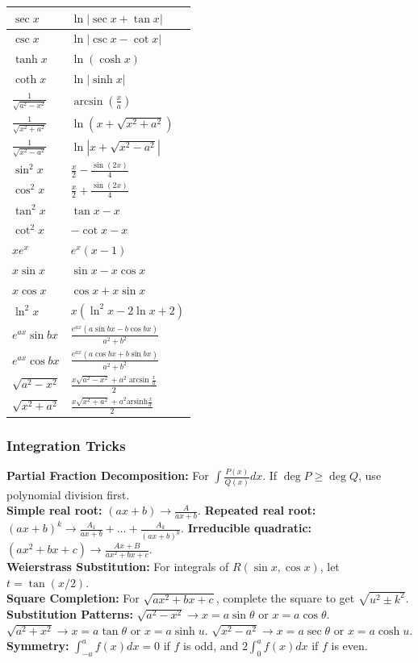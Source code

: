 \begin{center}
\begin{tabularx}{\columnwidth}{|>{\hsize=0.6\hsize\raggedright\arraybackslash}X|>{\hsize=1.4\hsize\raggedright\arraybackslash}X|}
$\sec x$ & $\ln|\sec x + \tan x|$ \\ \hline
$\csc x$ & $\ln|\csc x - \cot x|$ \\ \hline
$\tanh x$ & $\ln(\cosh x)$ \\ \hline
$\coth x$ & $\ln|\sinh x|$ \\ \hline
$\frac{1}{\sqrt{a^2-x^2}}$ & $\arcsin(\frac{x}{a})$ \\ \hline
$\frac{1}{\sqrt{x^2+a^2}}$ & $\ln(x+\sqrt{x^2+a^2})$ \\ \hline
$\frac{1}{\sqrt{x^2-a^2}}$ & $\ln|x+\sqrt{x^2-a^2}|$ \\ \hline
$\sin^2 x$ & $\frac{x}{2} - \frac{\sin(2x)}{4}$ \\ \hline
$\cos^2 x$ & $\frac{x}{2} + \frac{\sin(2x)}{4}$ \\ \hline
$\tan^2 x$ & $\tan x - x$ \\ \hline
$\cot^2 x$ & $-\cot x - x$ \\ \hline
$x e^x$ & $e^x(x-1)$ \\ \hline
$x \sin x$ & $\sin x - x \cos x$ \\ \hline
$x \cos x$ & $\cos x + x \sin x$ \\ \hline
$\ln^2 x$ & $x(\ln^2 x - 2\ln x + 2)$ \\ \hline
$e^{ax}\sin bx$ & $\frac{e^{ax}(a\sin bx - b\cos bx)}{a^2+b^2}$ \\ \hline
$e^{ax}\cos bx$ & $\frac{e^{ax}(a\cos bx + b\sin bx)}{a^2+b^2}$ \\ \hline
$\sqrt{a^2-x^2}$ & $\frac{x\sqrt{a^2-x^2} + a^2\arcsin\frac{x}{a}}{2}$ \\ \hline
$\sqrt{x^2+a^2}$ & $\frac{x\sqrt{x^2+a^2} + a^2\text{arsinh}\frac{x}{a}}{2}$ \\ \hline
\end{tabularx}
\end{center}

\subsubsection{Integration Tricks}
\textbf{Partial Fraction Decomposition:} For $\int \frac{P(x)}{Q(x)}dx$. If $\deg P \ge \deg Q$, use polynomial division first. \\
\textbf{Simple real root:} $(ax+b) \to \frac{A}{ax+b}$. \textbf{Repeated real root:} $(ax+b)^k \to \frac{A_1}{ax+b} + \dots + \frac{A_k}{(ax+b)^k}$. \textbf{Irreducible quadratic:} $(ax^2+bx+c) \to \frac{Ax+B}{ax^2+bx+c}$. \\
\textbf{Weierstrass Substitution:} For integrals of $R(\sin x, \cos x)$, let $t = \tan(x/2)$. \\
\textbf{Square Completion:} For $\sqrt{ax^2+bx+c}$, complete the square to get $\sqrt{u^2 \pm k^2}$. \\
\textbf{Substitution Patterns:} $\sqrt{a^2-x^2} \to x = a \sin \theta$ or $x = a \cos \theta$. $\sqrt{a^2+x^2} \to x = a \tan \theta$ or $x = a \sinh u$. $\sqrt{x^2-a^2} \to x = a \sec \theta$ or $x = a \cosh u$. \\
\textbf{Symmetry:} $\int_{-a}^a f(x)dx = 0$ if $f$ is odd, and $2\int_0^a f(x)dx$ if $f$ is even.



